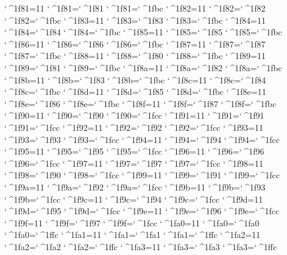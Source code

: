\catcode`^^^^1f81=11 \lccode`^^^^1f81=`^^^^1f81 \uccode`^^^^1f81=`^^^^1fbc 
\catcode`^^^^1f82=11 \lccode`^^^^1f82=`^^^^1f82 \uccode`^^^^1f82=`^^^^1fbc 
\catcode`^^^^1f83=11 \lccode`^^^^1f83=`^^^^1f83 \uccode`^^^^1f83=`^^^^1fbc 
\catcode`^^^^1f84=11 \lccode`^^^^1f84=`^^^^1f84 \uccode`^^^^1f84=`^^^^1fbc 
\catcode`^^^^1f85=11 \lccode`^^^^1f85=`^^^^1f85 \uccode`^^^^1f85=`^^^^1fbc 
\catcode`^^^^1f86=11 \lccode`^^^^1f86=`^^^^1f86 \uccode`^^^^1f86=`^^^^1fbc 
\catcode`^^^^1f87=11 \lccode`^^^^1f87=`^^^^1f87 \uccode`^^^^1f87=`^^^^1fbc 
\catcode`^^^^1f88=11 \lccode`^^^^1f88=`^^^^1f80 \uccode`^^^^1f88=`^^^^1fbc 
\catcode`^^^^1f89=11 \lccode`^^^^1f89=`^^^^1f81 \uccode`^^^^1f89=`^^^^1fbc 
\catcode`^^^^1f8a=11 \lccode`^^^^1f8a=`^^^^1f82 \uccode`^^^^1f8a=`^^^^1fbc 
\catcode`^^^^1f8b=11 \lccode`^^^^1f8b=`^^^^1f83 \uccode`^^^^1f8b=`^^^^1fbc 
\catcode`^^^^1f8c=11 \lccode`^^^^1f8c=`^^^^1f84 \uccode`^^^^1f8c=`^^^^1fbc 
\catcode`^^^^1f8d=11 \lccode`^^^^1f8d=`^^^^1f85 \uccode`^^^^1f8d=`^^^^1fbc 
\catcode`^^^^1f8e=11 \lccode`^^^^1f8e=`^^^^1f86 \uccode`^^^^1f8e=`^^^^1fbc 
\catcode`^^^^1f8f=11 \lccode`^^^^1f8f=`^^^^1f87 \uccode`^^^^1f8f=`^^^^1fbc 
\catcode`^^^^1f90=11 \lccode`^^^^1f90=`^^^^1f90 \uccode`^^^^1f90=`^^^^1fcc 
\catcode`^^^^1f91=11 \lccode`^^^^1f91=`^^^^1f91 \uccode`^^^^1f91=`^^^^1fcc 
\catcode`^^^^1f92=11 \lccode`^^^^1f92=`^^^^1f92 \uccode`^^^^1f92=`^^^^1fcc 
\catcode`^^^^1f93=11 \lccode`^^^^1f93=`^^^^1f93 \uccode`^^^^1f93=`^^^^1fcc 
\catcode`^^^^1f94=11 \lccode`^^^^1f94=`^^^^1f94 \uccode`^^^^1f94=`^^^^1fcc 
\catcode`^^^^1f95=11 \lccode`^^^^1f95=`^^^^1f95 \uccode`^^^^1f95=`^^^^1fcc 
\catcode`^^^^1f96=11 \lccode`^^^^1f96=`^^^^1f96 \uccode`^^^^1f96=`^^^^1fcc 
\catcode`^^^^1f97=11 \lccode`^^^^1f97=`^^^^1f97 \uccode`^^^^1f97=`^^^^1fcc 
\catcode`^^^^1f98=11 \lccode`^^^^1f98=`^^^^1f90 \uccode`^^^^1f98=`^^^^1fcc 
\catcode`^^^^1f99=11 \lccode`^^^^1f99=`^^^^1f91 \uccode`^^^^1f99=`^^^^1fcc 
\catcode`^^^^1f9a=11 \lccode`^^^^1f9a=`^^^^1f92 \uccode`^^^^1f9a=`^^^^1fcc 
\catcode`^^^^1f9b=11 \lccode`^^^^1f9b=`^^^^1f93 \uccode`^^^^1f9b=`^^^^1fcc 
\catcode`^^^^1f9c=11 \lccode`^^^^1f9c=`^^^^1f94 \uccode`^^^^1f9c=`^^^^1fcc 
\catcode`^^^^1f9d=11 \lccode`^^^^1f9d=`^^^^1f95 \uccode`^^^^1f9d=`^^^^1fcc 
\catcode`^^^^1f9e=11 \lccode`^^^^1f9e=`^^^^1f96 \uccode`^^^^1f9e=`^^^^1fcc 
\catcode`^^^^1f9f=11 \lccode`^^^^1f9f=`^^^^1f97 \uccode`^^^^1f9f=`^^^^1fcc 
\catcode`^^^^1fa0=11 \lccode`^^^^1fa0=`^^^^1fa0 \uccode`^^^^1fa0=`^^^^1ffc 
\catcode`^^^^1fa1=11 \lccode`^^^^1fa1=`^^^^1fa1 \uccode`^^^^1fa1=`^^^^1ffc 
\catcode`^^^^1fa2=11 \lccode`^^^^1fa2=`^^^^1fa2 \uccode`^^^^1fa2=`^^^^1ffc 
\catcode`^^^^1fa3=11 \lccode`^^^^1fa3=`^^^^1fa3 \uccode`^^^^1fa3=`^^^^1ffc 
